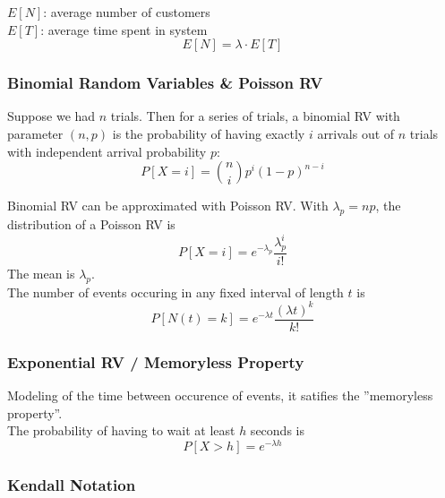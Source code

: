\documentclass[10pt, a4paper, twocolumn]{scrartcl}
\begin{document}
$E[N]$: average number of customers\\
$E[T]$: average time spent in system\\

\begin{displaymath}
	E[N] = \lambda\cdotp E[T]
\end{displaymath}

\subsubsection{Binomial Random Variables \& Poisson RV}

Suppose we had $n$ trials. Then for a series of trials, a binomial RV with parameter $(n,p)$ is the probability of having exactly $i$ arrivals out of $n$ trials with independent arrival probability $p$:
\begin{displaymath}
	P[X=i] = \binom{n}{i}p^i(1-p)^{n-i}
\end{displaymath}

Binomial RV can be approximated with Poisson RV. With $\lambda_{p} = np$, the distribution of a Poisson RV is
\begin{displaymath}
	P[X=i]=e^{-\lambda_{p}}\frac{\lambda_{p}^i}{i!}
\end{displaymath}
The mean is $\lambda_{p}$.\\

The number of events occuring in any fixed interval of length $t$ is
\begin{displaymath}
	P[N(t)=k]=e^{-\lambda t}\frac{(\lambda t)^k}{k!}
\end{displaymath}

\subsubsection{Exponential RV / Memoryless Property}

Modeling of the time between occurence of events, it satifies the ''memoryless property''.\\

The probability of having to wait at least $h$ seconds is
\begin{displaymath}
	P[X>h] = e^{-\lambda h}
\end{displaymath}

\subsubsection{Kendall Notation}
\end{document}
